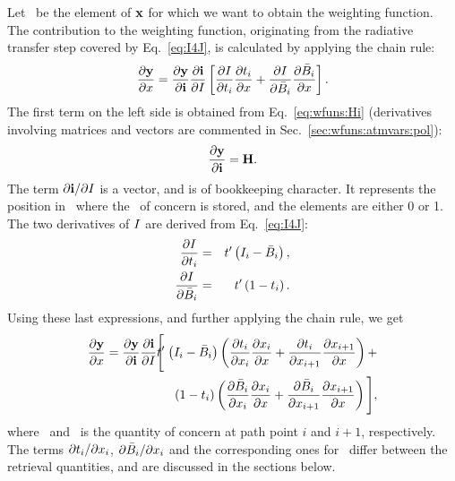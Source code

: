 Let \SttElm\ be the element of $\mathbf{x}$ for which we want to obtain the
weighting function. The contribution to the weighting function,
originating from the radiative transfer step covered by Eq.~\ref{eq:I4J}, is
calculated by applying the chain rule:
\begin{equation}
  \frac{\partial\mathbf{y}}{\partial x} =  
  \frac{\partial\mathbf{y}}{\partial\mathbf{i}}
  \frac{\partial\mathbf{i}}{\partial I} 
  \left[
  \frac{\partial I}{\partial t_{i}}\frac{\partial t_{i}}{\partial x} + 
  \frac{\partial I}{\partial\bar{B}_i}
  \frac{\partial\bar{B}_i}{\partial x} \right].
\end{equation}
The first term on the left side is obtained from Eq.~\ref{eq:wfuns:Hi}
(derivatives involving matrices and vectors are commented in
Sec.~\ref{sec:wfuns:atmvars:pol}):
\begin{equation}
  \frac{\partial\mathbf{y}}{\partial\mathbf{i}} = \mathbf{H}.
\end{equation}
The term $\partial\mathbf{i} / \partial I$ is a vector, and is of bookkeeping
character. It represents the position in \MpiVct\ where the \StoI\ of concern
is stored, and the elements are either 0 or 1.
The two derivatives of $I$ are derived from Eq.~\ref{eq:I4J}:
\begin{eqnarray}
  \frac{\partial I}{\partial t_{i}} 
      &=& t'\left(I_{i}-\bar{B}_i\right), \\
   \frac{\partial I}{\partial \bar{B}_i} &=&
   t'\left(1-t_{i}\right).
\end{eqnarray}
Using these last expressions, and further applying the chain rule, we get
\begin{eqnarray}
  \frac{\PartD\MsrVct}{\PartD\SttElm} =  
  \frac{\PartD\MsrVct}{\PartD\MpiVct}
  \frac{\PartD\MpiVct}{\PartD\StoI} \Trn'
  \!\!\!\!&\Bigg[&\!\!\!\!
      \left(\aStoI{i}-\bar{\Planck}_i\right)
      \left(
        \frac{\PartD\aTrn{i}}{\PartD\aSttElm{i}}
        \frac{\PartD\aSttElm{i}}{\PartD\SttElm} + 
        \frac{\PartD\aTrn{i}}{\PartD\aSttElm{i+1}}  
        \frac{\PartD\aSttElm{i+1}}{\PartD\SttElm} 
      \right) + \nonumber\\ && \!\!\!\!
      \left(1-\aTrn{i}\right)
      \left(
        \frac{\PartD\bar{\Planck}_i}{\PartD\aSttElm{i}}
        \frac{\PartD\aSttElm{i}}{\PartD\SttElm} + 
        \frac{\PartD\bar{\Planck}_i}{\PartD\aSttElm{i+1}}  
        \frac{\PartD\aSttElm{i+1}}{\PartD\SttElm}
     \right)
  \Bigg],  
  \label{eq:chainrule1}
\end{eqnarray}
where \ and \ is the quantity of concern at path point
$i$ and $i+1$, respectively. The terms $\partial t_{i}/\partial x_{i}$,
$\partial\bar{B}_i/\partial x_{i}$ and the corresponding ones for
\ differ between the retrieval quantities, and are discussed in
the sections below.

